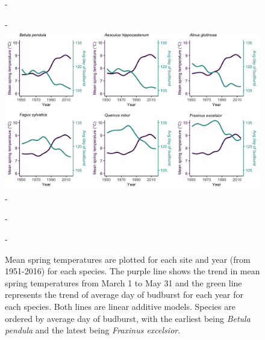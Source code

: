 \documentclass{article}\usepackage[]{graphicx}\usepackage[]{color}
\begin{document}
{\begin{figure} [H]
  -\begin{center}
  -\includegraphics[width=16cm]{..//analyses/figures/MSTBB_bySpp_lines.png}
  -\caption{Mean spring temperatures are plotted for each site and year (from 1951-2016) for each species. The purple line shows the trend in mean spring temperatures from March 1 to May 31 and the green line represents the trend of average day of budburst for each year for each species. Both lines are linear additive models. Species are ordered by average day of budburst, with the earliest being \textit{Betula pendula} and the latest being \textit{Fraxinus excelsior}. }\label{fig:mst}
  -\end{center}
  -\end{figure}}
\end{document}

